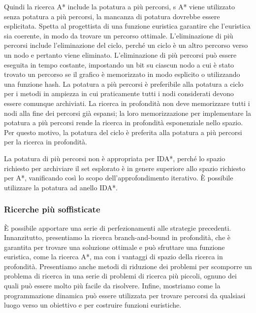 \documentclass[a4paper]{extarticle}
\begin{document}
Quindi la ricerca A* include la potatura a più percorsi, s A* viene utilizzato senza potatura a più percorsi, la mancanza di potatura dovrebbe essere esplicitata. Spetta al progettista di una funzione euristica garantire che l'euristica sia coerente, in modo da trovare un percorso ottimale. L'eliminazione di più percorsi include l'eliminazione del ciclo, perché un ciclo è un altro percorso verso un nodo e pertanto viene eliminato. L'eliminazione di più percorsi può essere eseguita in tempo costante, impostando un bit su ciascun nodo a cui è stato trovato un percorso se il grafico è memorizzato in modo esplicito o utilizzando una funzione hash. La potatura a più percorsi è preferibile alla potatura a ciclo per i metodi in ampiezza in cui praticamente tutti i nodi considerati devono essere comunque archiviati. La ricerca in profondità non deve memorizzare tutti i nodi alla fine dei percorsi già espansi; la loro memorizzazione per implementare la potatura a più percorsi rende la ricerca in profondità esponenziale nello spazio. Per questo motivo, la potatura del ciclo è preferita alla potatura a più percorsi per la ricerca in profondità.

La potatura di più percorsi non è appropriata per IDA*, perché lo spazio richiesto per archiviare il set esplorato è in genere superiore allo spazio richiesto per A*, vanificando così lo scopo dell'approfondimento iterativo. È possibile utilizzare la potatura ad anello IDA*.

\subsubsection{Ricerche più soffisticate}

È possibile apportare una serie di perfezionamenti alle strategie precedenti. Innanzitutto, presentiamo la ricerca branch-and-bound in profondità, che è garantita per trovare una soluzione ottimale e può sfruttare una funzione euristica, come la ricerca A*, ma con i vantaggi di spazio della ricerca in profondità. Presentiamo anche metodi di riduzione dei problemi per scomporre un problema di ricerca in una serie di problemi di ricerca più piccoli, ognuno dei quali può essere molto più facile da risolvere. Infine, mostriamo come la programmazione dinamica può essere utilizzata per trovare percorsi da qualsiasi luogo verso un obiettivo e per costruire funzioni euristiche.
\end{document}
